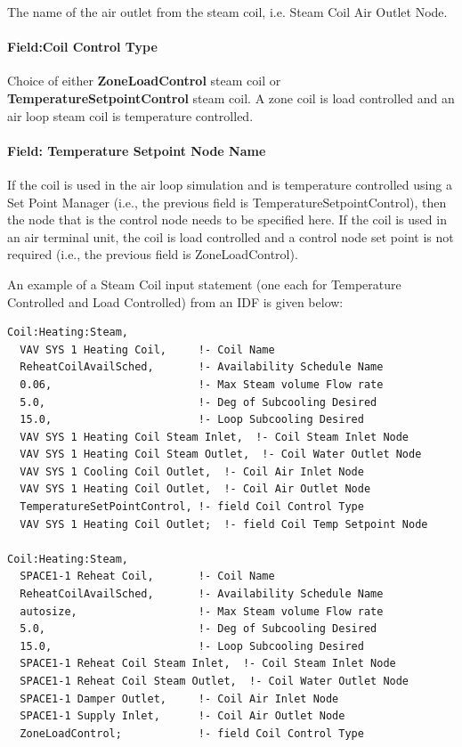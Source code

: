 The name of the air outlet from the steam coil, i.e. Steam Coil Air Outlet Node.

\paragraph{Field:Coil Control Type}\label{fieldcoil-control-type}

Choice of either \textbf{ZoneLoadControl} steam coil or \textbf{TemperatureSetpointControl} steam coil. A zone coil is load controlled and an air loop steam coil is temperature controlled.

\paragraph{Field: Temperature Setpoint Node Name}\label{field-temperature-setpoint-node-name}

If the coil is used in the air loop simulation and is temperature controlled using a Set Point Manager (i.e., the previous field is TemperatureSetpointControl), then the node that is the control node needs to be specified here. If the coil is used in an air terminal unit, the coil is load controlled and a control node set point is not required (i.e., the previous field is ZoneLoadControl).

An example of a Steam Coil input statement (one each for Temperature Controlled and Load Controlled) from an IDF is given below:

\begin{lstlisting}
Coil:Heating:Steam,
  VAV SYS 1 Heating Coil,     !- Coil Name
  ReheatCoilAvailSched,       !- Availability Schedule Name
  0.06,                       !- Max Steam volume Flow rate
  5.0,                        !- Deg of Subcooling Desired
  15.0,                       !- Loop Subcooling Desired
  VAV SYS 1 Heating Coil Steam Inlet,  !- Coil Steam Inlet Node
  VAV SYS 1 Heating Coil Steam Outlet,  !- Coil Water Outlet Node
  VAV SYS 1 Cooling Coil Outlet,  !- Coil Air Inlet Node
  VAV SYS 1 Heating Coil Outlet,  !- Coil Air Outlet Node
  TemperatureSetPointControl, !- field Coil Control Type
  VAV SYS 1 Heating Coil Outlet;  !- field Coil Temp Setpoint Node

Coil:Heating:Steam,
  SPACE1-1 Reheat Coil,       !- Coil Name
  ReheatCoilAvailSched,       !- Availability Schedule Name
  autosize,                   !- Max Steam volume Flow rate
  5.0,                        !- Deg of Subcooling Desired
  15.0,                       !- Loop Subcooling Desired
  SPACE1-1 Reheat Coil Steam Inlet,  !- Coil Steam Inlet Node
  SPACE1-1 Reheat Coil Steam Outlet,  !- Coil Water Outlet Node
  SPACE1-1 Damper Outlet,     !- Coil Air Inlet Node
  SPACE1-1 Supply Inlet,      !- Coil Air Outlet Node
  ZoneLoadControl;            !- field Coil Control Type
\end{lstlisting}

